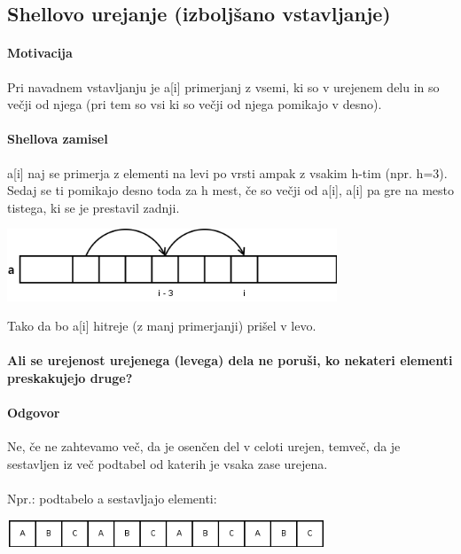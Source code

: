 \documentclass[a4paper,10pt]{article}
\begin{document}
\subsection{Shellovo urejanje (izbolj\v sano vstavljanje)}

\paragraph{Motivacija}
Pri navadnem vstavljanju je a[i] primerjanj z vsemi, ki so v urejenem delu in so ve\v cji od njega (pri tem so vsi ki so ve\v cji od njega pomikajo v desno).

\paragraph{Shellova zamisel}
a[i] naj se primerja z elementi na levi po vrsti ampak z vsakim h-tim (npr. h=3). Sedaj se ti pomikajo desno toda za h mest, \v ce so ve\v cji od a[i], a[i] pa gre na mesto tistega, ki se je prestavil zadnji.
	\begin{center}
	\includegraphics[width=9.85cm,height=2.15cm]{Slike/ShellovoUrejanje1.png}
	\end{center}
Tako da bo a[i] hitreje (z manj primerjanji) pri\v sel v levo.\\
\\
\textbf{Ali se urejenost urejenega (levega) dela ne poru\v si, ko nekateri elementi preskakujejo druge?}

\paragraph{Odgovor}
Ne, \v ce ne zahtevamo ve\v c, da je osen\v cen del v celoti urejen, temve\v c, da je sestavljen iz ve\v c podtabel od katerih je vsaka zase urejena.\\
\\
Npr.: podtabelo a sestavljajo elementi:
	\begin{center}
	\includegraphics[width=9.5cm,height=0.8cm]{Slike/ShellovoUrejanje2.png}
	\end{center}
\end{document}
